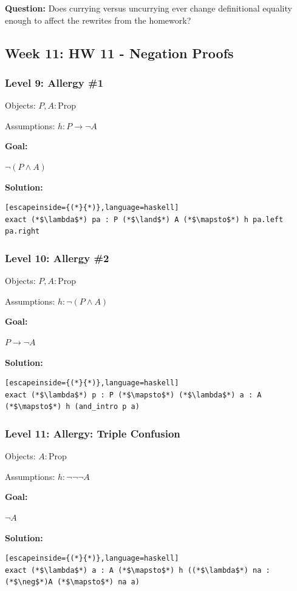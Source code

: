 \documentclass{article}
\theoremstyle{theorem}
\theoremstyle{definition}
\theoremstyle{remark}
\begin{document}
\textbf{Question:}
Does currying versus uncurrying ever change definitional equality enough to affect the rewrites from the homework?

\subsection{Week 11: HW 11 - Negation Proofs}

\subsubsection{Level 9: Allergy \#1}

Objects:
$P, A: \text{Prop}$

Assumptions:
$h: P \to \neg A$

\textbf{Goal:}

$\neg(P \land A)$

\textbf{Solution:}
\begin{lstlisting}[escapeinside={(*}{*)},language=haskell]
exact (*$\lambda$*) pa : P (*$\land$*) A (*$\mapsto$*) h pa.left pa.right
\end{lstlisting}

\subsubsection{Level 10: Allergy \#2}

Objects:
$P, A: \text{Prop}$

Assumptions:
$h: \neg(P \land A)$

\textbf{Goal:}

$P \to \neg A$

\textbf{Solution:}
\begin{lstlisting}[escapeinside={(*}{*)},language=haskell]
exact (*$\lambda$*) p : P (*$\mapsto$*) (*$\lambda$*) a : A (*$\mapsto$*) h (and_intro p a)
\end{lstlisting}

\subsubsection{Level 11: Allergy: Triple Confusion}

Objects:
$A: \text{Prop}$

Assumptions:
$h: \neg\neg\neg A$

\textbf{Goal:}

$\neg A$

\textbf{Solution:}
\begin{lstlisting}[escapeinside={(*}{*)},language=haskell]
exact (*$\lambda$*) a : A (*$\mapsto$*) h ((*$\lambda$*) na : (*$\neg$*)A (*$\mapsto$*) na a)
\end{lstlisting}
\end{document}
